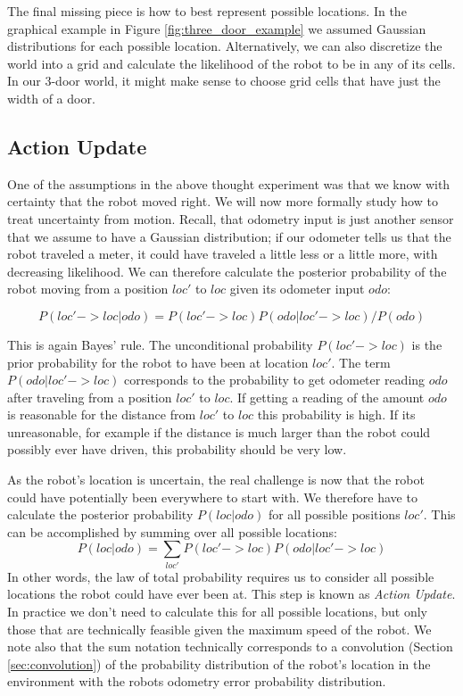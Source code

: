 The final missing piece is how to best represent possible locations. In the graphical example in Figure \ref{fig:three_door_example} we assumed Gaussian distributions for each possible location. Alternatively, we can also discretize the world into a grid and calculate the likelihood of the robot to be in any of its cells. In our 3-door world, it might make sense to choose grid cells that have just the width of a door.

\subsection{Action Update}
One of the assumptions in the above thought experiment was that we know with certainty that the robot moved right. We will now more formally study how to treat uncertainty from motion. Recall, that odometry input is just another sensor that we assume to have a Gaussian distribution; if our odometer tells us that the robot traveled a meter, it could have traveled a  little less or a little more, with decreasing likelihood. We can therefore calculate the posterior probability of the robot moving from a position $loc'$ to $loc$ given its odometer input $odo$:

\begin{equation}
P(loc'->loc|odo)=P(loc'->loc)P(odo|loc'->loc)/P(odo)
\end{equation}

This is again Bayes' rule. The unconditional probability $P(loc'->loc)$ is the prior probability for the robot to have been at location $loc'$. The term $ P(odo|loc'->loc)$ corresponds to the probability to get odometer reading $odo$ after traveling from a position $loc'$ to $loc$. If getting a reading of the amount $odo$ is reasonable for the distance from $loc'$ to $loc$ this probability is high. If its unreasonable, for example if the distance is much larger than the robot could possibly ever have driven, this probability should be very low. 

As the robot's location is uncertain, the real challenge is now that the robot could have potentially been everywhere to start with. We therefore have to calculate the posterior probability $P(loc|odo)$ for all possible positions $loc'$. This can be accomplished by summing over all possible locations:
\begin{equation}
P(loc|odo)=\sum_{loc'}P(loc'->loc)P(odo|loc'->loc)
\end{equation}
In other words, the law of total probability requires us to consider all possible locations the robot could have ever been at. This step is known as \emph{Action Update}. In practice we don't need to calculate this for all possible locations, but only those that are technically feasible given the maximum speed of the robot. We note also that the sum notation technically corresponds to a convolution (Section \ref{sec:convolution}) of the probability distribution of the robot's location in the environment with the robots odometry error probability distribution.

